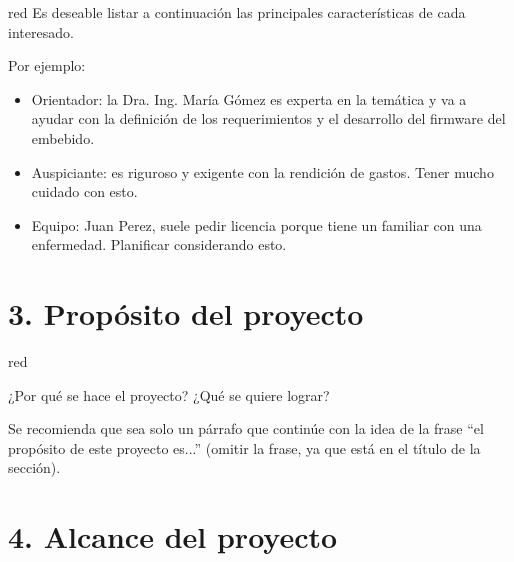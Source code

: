 \documentclass[
11pt, %
]{charter}
\begin{document}
\begin{consigna}{red}
Es deseable listar a continuación las principales características de cada interesado.
 
Por ejemplo:
\begin{itemize}
	\item Orientador: la Dra. Ing. María Gómez es experta en la temática y va a ayudar con la definición de los requerimientos y el desarrollo del firmware del embebido.
	\item Auspiciante: es riguroso y exigente con la rendición de gastos. Tener mucho cuidado con esto.
	\item Equipo: Juan Perez, suele pedir licencia porque tiene un familiar con una enfermedad. Planificar considerando esto.
\end{itemize}

\end{consigna} %


\section{3. Propósito del proyecto}
\label{sec:proposito}

\begin{consigna}{red} %

¿Por qué se hace el proyecto? ¿Qué se quiere lograr? 

Se recomienda que sea solo un párrafo que continúe con la idea de la frase ``el propósito de este proyecto es...'' (omitir la frase, ya que está en el título de la sección).
\end{consigna} %


\section{4. Alcance del proyecto}
\label{sec:alcance}
\end{document}
